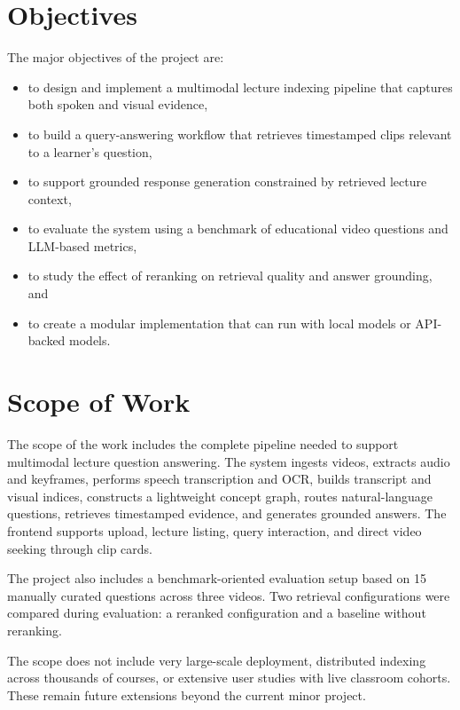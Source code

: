 \documentclass[12pt,a4paper,oneside]{report}
\begin{document}
\section{Objectives}
The major objectives of the project are:
\begin{itemize}
    \item to design and implement a multimodal lecture indexing pipeline that captures both spoken and visual evidence,
    \item to build a query-answering workflow that retrieves timestamped clips relevant to a learner's question,
    \item to support grounded response generation constrained by retrieved lecture context,
    \item to evaluate the system using a benchmark of educational video questions and LLM-based metrics,
    \item to study the effect of reranking on retrieval quality and answer grounding, and
    \item to create a modular implementation that can run with local models or API-backed models.
\end{itemize}

\section{Scope of Work}
The scope of the work includes the complete pipeline needed to support multimodal lecture question answering. The system ingests videos, extracts audio and keyframes, performs speech transcription and OCR, builds transcript and visual indices, constructs a lightweight concept graph, routes natural-language questions, retrieves timestamped evidence, and generates grounded answers. The frontend supports upload, lecture listing, query interaction, and direct video seeking through clip cards.

The project also includes a benchmark-oriented evaluation setup based on 15 manually curated questions across three videos. Two retrieval configurations were compared during evaluation: a reranked configuration and a baseline without reranking.

The scope does not include very large-scale deployment, distributed indexing across thousands of courses, or extensive user studies with live classroom cohorts. These remain future extensions beyond the current minor project.
\end{document}
